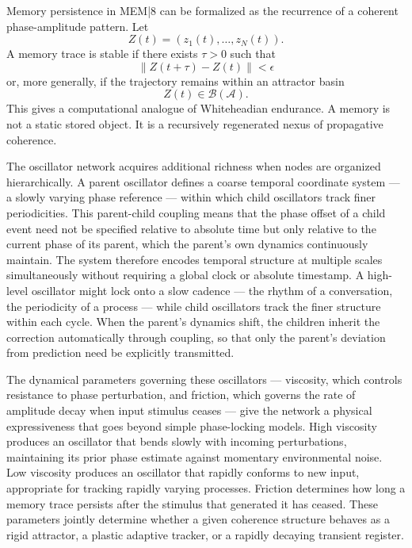 \documentclass[12pt,a4paper]{article}
\begin{document}
Memory persistence in MEM|8 can be formalized as the recurrence of a coherent phase-amplitude pattern. Let
\[
Z(t)=(z_1(t),\dots,z_N(t)).
\]
A memory trace is stable if there exists \(\tau>0\) such that
\[
\|Z(t+\tau)-Z(t)\|<\epsilon
\]
or, more generally, if the trajectory remains within an attractor basin
\[
Z(t)\in\mathcal{B}(\mathcal{A}).
\]
This gives a computational analogue of Whiteheadian endurance. A memory is not a static stored object. It is a recursively regenerated nexus of propagative coherence.

The oscillator network acquires additional richness when nodes are organized hierarchically. A parent oscillator defines a coarse temporal coordinate system — a slowly varying phase reference — within which child oscillators track finer periodicities. This parent-child coupling means that the phase offset of a child event need not be specified relative to absolute time but only relative to the current phase of its parent, which the parent's own dynamics continuously maintain. The system therefore encodes temporal structure at multiple scales simultaneously without requiring a global clock or absolute timestamp. A high-level oscillator might lock onto a slow cadence — the rhythm of a conversation, the periodicity of a process — while child oscillators track the finer structure within each cycle. When the parent's dynamics shift, the children inherit the correction automatically through coupling, so that only the parent's deviation from prediction need be explicitly transmitted.

The dynamical parameters governing these oscillators — viscosity, which controls resistance to phase perturbation, and friction, which governs the rate of amplitude decay when input stimulus ceases — give the network a physical expressiveness that goes beyond simple phase-locking models. High viscosity produces an oscillator that bends slowly with incoming perturbations, maintaining its prior phase estimate against momentary environmental noise. Low viscosity produces an oscillator that rapidly conforms to new input, appropriate for tracking rapidly varying processes. Friction determines how long a memory trace persists after the stimulus that generated it has ceased. These parameters jointly determine whether a given coherence structure behaves as a rigid attractor, a plastic adaptive tracker, or a rapidly decaying transient register.
\end{document}
